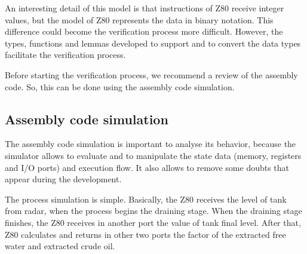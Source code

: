 \documentclass[11pt]{article} %
\begin{document}
An interesting detail of this model is  that instructions of Z80 receive integer
values, but the model of Z80 represents the data in binary notation. This
difference could become the verification process more difficult. However, the
types, functions and lemmas developed to support and to convert the data types
facilitate the verification process.

Before starting the verification process, we recommend a review of the assembly code. 
So, this can be done using the assembly code simulation.


\subsection{Assembly code simulation}


The assembly code simulation is important to analyse its behavior, because the
simulator allows to evaluate and to manipulate the state data (memory, registers and I/O ports) and execution flow.
It also allows to remove some doubts that appear during the development. 

The process simulation is simple. Basically, the Z80 receives the level of tank from radar, 
when the process begins the draining stage. When the draining stage finishes,
the Z80 receives in another port the value of tank final level. After that,
Z80 calculates and returns in other two ports the factor of the extracted free
water and extracted crude oil.

\end{document}
